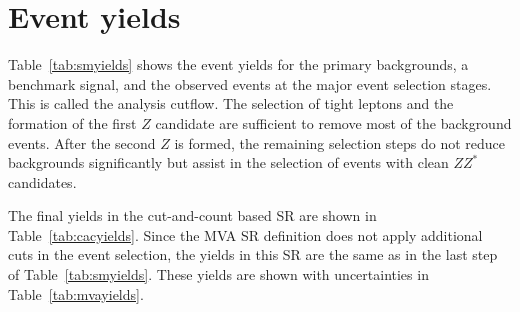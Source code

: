 \section{Event yields}

Table~\ref{tab:smyields} shows the event yields for the primary backgrounds, a benchmark signal, and the observed events at the major event selection stages. This is called the analysis cutflow. The selection of tight leptons and the formation of the first $Z$ candidate are sufficient to remove most of the background events. After the second $Z$ is formed, the remaining selection steps do not reduce backgrounds significantly but assist in the selection of events with clean $ZZ^*$ candidates. 

\begin{table}[htbH]
\begin{center}
\caption{Cutflow table for the $4\mu$ channel. The benchmark signal sample shown is Zp2HDM with $m_{Z'}=600$ $\GeV$.}\label{tab:smyields}
\end{center}
\end{table}

The final yields in the cut-and-count based SR are shown in Table~\ref{tab:cacyields}. 
Since the MVA SR definition does not apply additional cuts in the event selection, the yields in this SR are the same as in the last step of Table~\ref{tab:smyields}. These yields are shown with uncertainties in Table~\ref{tab:mvayields}.


